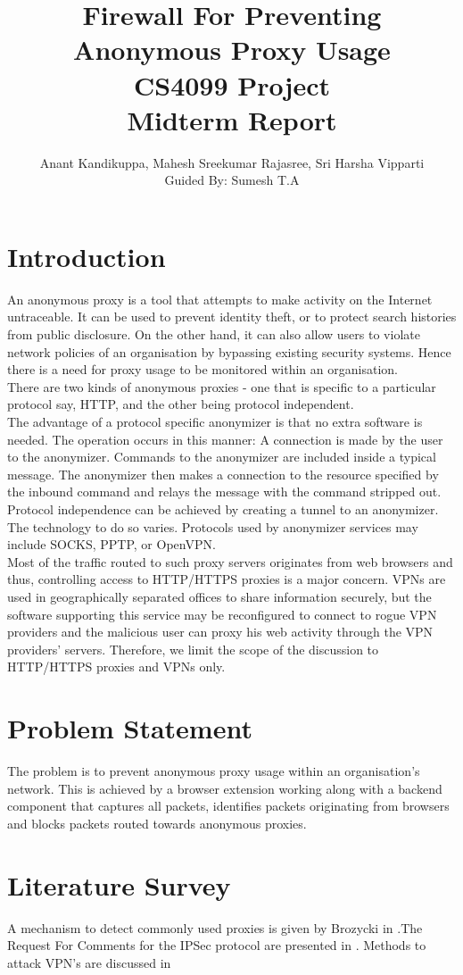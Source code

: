 \documentclass[a4paper,11pt,twocolumn]{article}
\title{Firewall For Preventing Anonymous Proxy Usage\\ {\normalsize CS4099 Project\\Midterm Report}}
\author{Anant Kandikuppa, Mahesh Sreekumar Rajasree, Sri Harsha Vipparti\\Guided By: Sumesh T.A}
\begin{document}
\maketitle
\section{Introduction}
An anonymous proxy is a tool that attempts to make activity on the Internet untraceable. It can be used to prevent identity theft, or to protect search histories from public disclosure. On the other hand, it can also allow users to violate network policies of an organisation by bypassing existing security systems. Hence there is a need for proxy usage to be monitored within an organisation.\\
There are two kinds of anonymous proxies - one that is specific to a particular protocol say, HTTP, and the other being protocol independent.\\
The advantage of a protocol specific anonymizer is that no extra software is needed. The operation occurs in this manner: A connection is made by the user to the anonymizer. Commands to the anonymizer are included inside a typical message. The anonymizer then makes a connection to the resource specified by the inbound command and relays the message with the command stripped out.\\
Protocol independence can be achieved by creating a tunnel to an anonymizer. The technology to do so varies. Protocols used by anonymizer services may include SOCKS, PPTP, or OpenVPN.\\
Most of the traffic routed to such proxy servers originates from web browsers and thus, controlling access to HTTP/HTTPS proxies is a major concern. VPNs are used in geographically separated offices to share information securely, but the software supporting this service may be reconfigured to connect to rogue VPN providers and the malicious user can proxy his web activity through the VPN providers' servers. Therefore, we limit the scope of the discussion to HTTP/HTTPS proxies and VPNs only. 
\section{Problem Statement}
The problem is to prevent anonymous proxy usage within an organisation’s network. This is achieved by a browser extension working along with a backend component that captures all packets, identifies packets originating from browsers and blocks packets routed towards anonymous proxies.
\section{Literature Survey }
 A mechanism to detect commonly used proxies is given by Brozycki in \cite{brozyckidetecting}.The Request For Comments for the IPSec protocol are presented in \cite{RFC4301}. Methods to attack VPN's are discussed in \cite{adrianimperfect}
\end{document}

